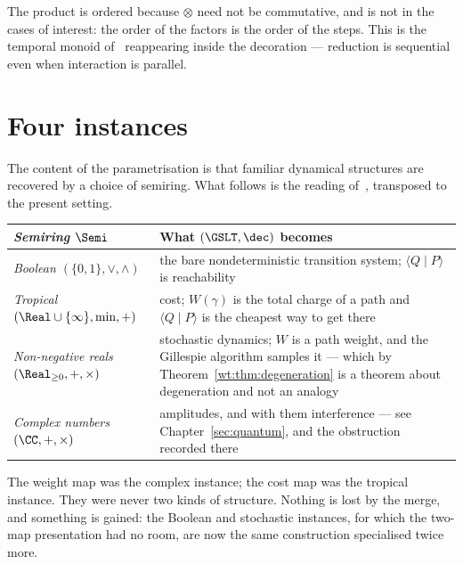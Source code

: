 The product is ordered because $\otimes$ need not be commutative, and is
not in the cases of interest: the order of the factors is the order of the
steps.  This is the temporal monoid of~\cite[\S4]{CE} reappearing inside
the decoration --- reduction is sequential even when interaction is
parallel.

\section{Four instances}

The content of the parametrisation is that familiar dynamical structures
are recovered by a choice of semiring.  What follows is the reading
of~\cite[\S13]{CE}, transposed to the present setting.

\begin{center}
\renewcommand{\arraystretch}{1.35}
\begin{tabular}{>{\itshape}p{4.3cm} p{7.4cm}}
\toprule
\normalfont\textbf{Semiring $\Semi$} & \textbf{What $(\GSLT,\dec)$ becomes} \\
\midrule
Boolean $(\{0,1\},\vee,\wedge)$
  & the bare nondeterministic transition system; $\langle Q\mid P\rangle$
    is reachability \\
Tropical $(\Real\cup\{\infty\},\min,+)$
  & cost; $W(\gamma)$ is the total charge of a path and
    $\langle Q\mid P\rangle$ is the cheapest way to get there \\
Non-negative reals $(\Real_{\geq 0},+,\times)$
  & stochastic dynamics; $W$ is a path weight, and the Gillespie
    algorithm samples it --- which by
    Theorem~\ref{wt:thm:degeneration} is a theorem about degeneration
    and not an analogy \\
Complex numbers $(\CC,+,\times)$
  & amplitudes, and with them interference --- see
    Chapter~\ref{sec:quantum}, and the obstruction recorded there \\
\bottomrule
\end{tabular}
\end{center}

\begin{remark}
The weight map was the complex instance; the cost map was the tropical
instance.  They were never two kinds of structure.  Nothing is lost by
the merge, and something is gained: the Boolean and stochastic instances,
for which the two-map presentation had no room, are now the same
construction specialised twice more.
\end{remark}

